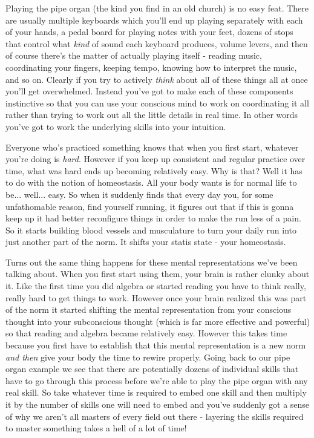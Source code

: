 \documentclass[11pt]{book}
\begin{document}
Playing the pipe organ (the kind you find in an old church) is no easy feat. There are usually multiple keyboards which you'll end up playing separately with each of your hands, a pedal board for playing notes with your feet, dozens of stops that control what \textit{kind} of sound each keyboard produces, volume levers, and then of course there's the matter of actually playing itself - reading music, coordinating your fingers, keeping tempo, knowing how to interpret the music, and so on. Clearly if you try to actively \textit{think} about all of these things all at once you'll get overwhelmed. Instead you've got to make each of these components instinctive so that you can use your conscious mind to work on coordinating it all rather than trying to work out all the little details in real time. In other words you've got to work the underlying skills into your intuition.
\newline 

Everyone who's practiced something knows that when you first start, whatever you're doing is \textit{hard}. However if you keep up consistent and regular practice over time, what was hard ends up becoming relatively easy. Why is that? Well it has to do with the notion of homeostasis. All your body wants is for normal life to be... well... easy. So when it suddenly finds that every day you, for some unfathomable reason, find yourself running, it figures out that if this is gonna keep up it had better reconfigure things in order to make the run less of a pain. So it starts building blood vessels and musculature to turn your daily run into just another part of the norm. It shifts your statis state - your homeostasis. 
\newline

Turns out the same thing happens for these mental representations we've been talking about. When you first start using them, your brain is rather clunky about it. Like the first time you did algebra or started reading you have to think really, really hard to get things to work. However once your brain realized this was part of the norm it started shifting the mental representation from your conscious thought into your subconscious thought (which is far more effective and powerful) so that reading and algebra became relatively easy. However this takes time because you first have to establish that this mental representation is a new norm \textit{and then} give your body the time to rewire properly. Going back to our pipe organ example we see that there are potentially dozens of individual skills that have to go through this process before we're able to play the pipe organ with any real skill. So take whatever time is required to embed one skill and then multiply it by the number of skills one will need to embed and you've suddenly got a sense of why we aren't all masters of every field out there - layering the skills required to master something takes a hell of a lot of time!
\newline
\end{document}

